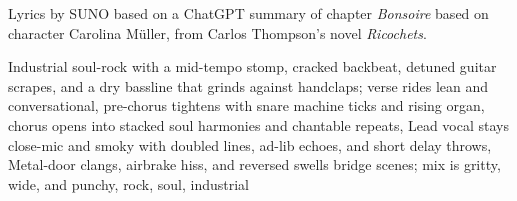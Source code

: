 
\begin{notes}
Lyrics by SUNO based on a ChatGPT summary of chapter \emph{Bonsoire} based on character Carolina Müller, from Carlos Thompson's novel \emph{Ricochets}.
\end{notes}
\begin{style}
Industrial soul-rock with a mid-tempo stomp, cracked backbeat, detuned guitar scrapes, and a dry bassline that grinds against handclaps; verse rides lean and conversational, pre-chorus tightens with snare machine ticks and rising organ, chorus opens into stacked soul harmonies and chantable repeats, Lead vocal stays close-mic and smoky with doubled lines, ad-lib echoes, and short delay throws, Metal-door clangs, airbrake hiss, and reversed swells bridge scenes; mix is gritty, wide, and punchy, rock, soul, industrial
\end{style}
